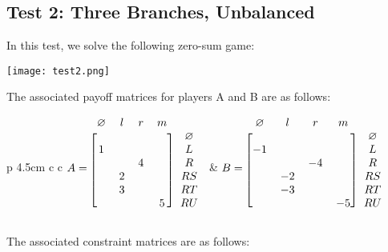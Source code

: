 \documentclass[11pt]{tufte-handout}
\theoremstyle{plain}
\theoremstyle{definition}
\theoremstyle{remark}
\begin{document}
\subsection{Test 2: Three Branches, Unbalanced}
In this test, we solve the following zero-sum game:
\\[6pt]
\begin{center}
    \texttt{[image: test2.png]}
\end{center}
The associated payoff matrices for players A and B are as follows:\\[6pt]
\begin{tabular}{p {4.5cm} c c}
     {$\displaystyle
        A = \begin{blockarray}{c c c c c}
            \varnothing & l & r & m\\
            \begin{block}{[c c c c] c}
                &   &   & & \varnothing \\
              1 &   &   & & L \\
                &   & 4 & & R \\
                & 2 &  &  & RS \\
                & 3 &  & & RT \\
                &  &  &5 & RU \\                
            \end{block}
            \end{blockarray}$} &
        {$B = \begin{blockarray}{c c c c c}
                \varnothing & l & r & m\\
                \begin{block}{[c c c c] c}
                    &   &    & & \varnothing \\
                 -1 &   &    & & L \\
                    &   & -4 & & R \\
                    & -2 &  &  & RS \\
                    & -3 &  & & RT \\
                    &  &  & -5& RU \\
                \end{block}
                \end{blockarray}
    $}
\end{tabular}

The associated constraint matrices are as follows: \\[12pt]
\end{document}

